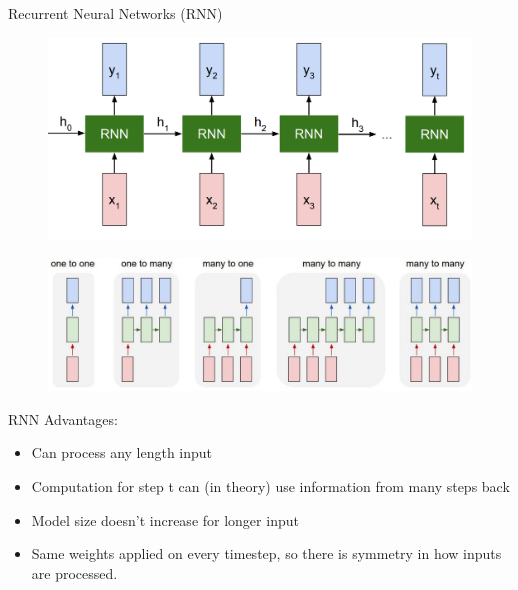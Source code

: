 \begin{frame}[allowframebreaks]{Recurrent Neural Networks (RNN)}
    \begin{figure}
    \centering
    \includegraphics[width=1.0\textwidth,height=1.0\textheight,keepaspectratio]{images/advanced-cv/rnn_3.png}
    \end{figure}  

\framebreak

    \begin{figure}
    \centering
    \includegraphics[width=1.0\textwidth,height=1.0\textheight,keepaspectratio]{images/advanced-cv/rnn_4.png}
    \end{figure}  

\framebreak
    
    \large RNN Advantages:
        \begin{itemize}
            \item Can process any length input
            \item Computation for step t can (in theory) use information from many steps back 
            \item Model size doesn’t increase for longer input 
            \item Same weights applied on every timestep, so there is symmetry in how inputs are processed. 
        \end{itemize}

\framebreak


\end{frame}
